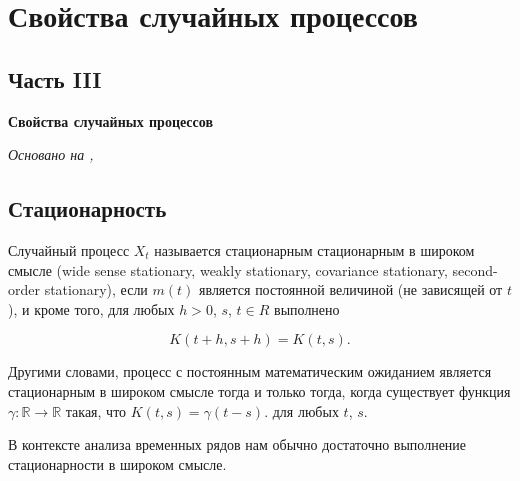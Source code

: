 \chapter{Свойства случайных процессов}
\section*{Часть III} \textbf{Свойства случайных процессов}

\textit{Основано на \cite{adeshereKorrelyaciyaMezhduVremennymi2021},
\cite{panovTeoriyaSluchaynyhProcessov2018}}

\section{Стационарность}
 {
  Случайный процесс \( X_t \) называется
  стационарным стационарным в широком смысле (wide sense stationary,
    weakly stationary, covariance stationary,
  second-order stationary), если $m(t)$ является постоянной величиной
  (не зависящей от $t$), и кроме того, для любых $h > 0$, $s$, $t \in
  R$ выполнено

\[ K(t + h, s + h) = K(t, s). \] }

Другими словами, процесс с постоянным математическим ожиданием
является стационарным в широком смысле тогда и только тогда, когда
существует функция $ \gamma : \mathbb{R} \to \mathbb{R} $ такая, что $
K(t, s) = \gamma(t-s). $ для любых $t$, $s$.

В контексте анализа временных рядов
нам обычно достаточно выполнение стационарности в широком смысле.

